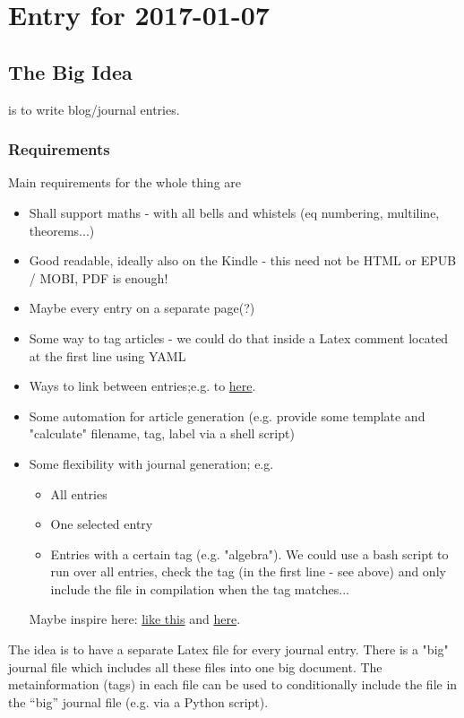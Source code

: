 \section{Entry for 2017-01-07}

\subsection{The Big Idea}

is to write blog/journal entries.

\subsubsection{Requirements}

Main requirements for the whole thing are

\begin{itemize}

\item Shall support maths - with all bells and whistels (eq numbering, multiline, theorems...)

\item Good readable, ideally also on the Kindle - this need not be HTML or EPUB / MOBI, PDF is enough!

\item Maybe every entry on a separate page(?)

\item Some way to tag articles - we could do that inside a Latex comment located at the first line using YAML

\item Ways to link between entries;e.g. to \hyperref[2017-01-08:entry]{here}.

\item Some automation for article generation (e.g. provide some template and "calculate" filename, tag, label via a shell script)

\item Some flexibility with journal generation; e.g.

\begin{itemize} 
\item All entries
\item One selected entry
\item Entries with a certain tag (e.g. "algebra"). We could use a bash script to run over all entries, check the tag (in the first line - see above) and only include the file in compilation when the tag matches...
\end{itemize}

Maybe inspire here: \href{https://github.com/sanjayankur31/calliope/blob/master/calliope.sh}{like this} and \href{https://www.reddit.com/r/LaTeX/comments/2xysse/i_am_trying_to_make_a_research_diary_that/}{here}.


\end{itemize}

The idea is to have a separate Latex file for every journal entry. There is a "big" journal file which includes all these files into one big document. The metainformation (tags) in each file can be used to conditionally include the file in the ``big'' journal file (e.g. via a Python script).

